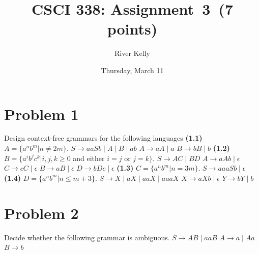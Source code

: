 \documentclass[11pt]{article}
\title{CSCI 338: Assignment~3~(7 points)}
\author{River Kelly}
\date{Thursday, March 11}
\begin{document}
\maketitle

\newpage
\section*{Problem 1}
\noindent
Design context-free grammars for the following languages
\newline
\newline
\noindent
\textbf{(1.1)} $A=\{a^nb^m|n\neq 2m\}$.
\newline
\newline
$S \rightarrow aaSb \mid A \mid B \mid ab$
\newline
$A \rightarrow aA \mid a$
\newline
$B \rightarrow bB \mid b$
\newline
\newline
\noindent
\textbf{(1.2)} $B=\{a^ib^jc^k|i,j,k\geq 0$ and either $i=j$ or $j=k\}$.
\newline
\newline
$S \rightarrow AC \mid BD$
\newline
$A \rightarrow aAb \mid \epsilon$
\newline
$C \rightarrow cC \mid \epsilon$
\newline
$B \rightarrow aB \mid \epsilon$
\newline
$D \rightarrow bDc \mid \epsilon$
\newline
\newline
\noindent
\textbf{(1.3)} $C=\{a^nb^m|n=3m\}$.
\newline
\newline
$S \rightarrow aaaSb \mid \epsilon$
\newline
\newline
\noindent
\textbf{(1.4)} $D=\{a^nb^m|n\leq m+3\}$.
\newline
\newline
$S \rightarrow X \mid aX \mid aaX \mid aaaX $
\newline
$X \rightarrow  aXb \mid \epsilon $
\newline
$Y \rightarrow bY \mid b $



\newpage
\section*{Problem 2}

\noindent
Decide whether the following grammar is ambiguous.
\newline
\newline
$S\rightarrow AB \mid aaB$
\newline
$A\rightarrow a \mid Aa$
\newline
$B\rightarrow b$
\newline
\end{document}
